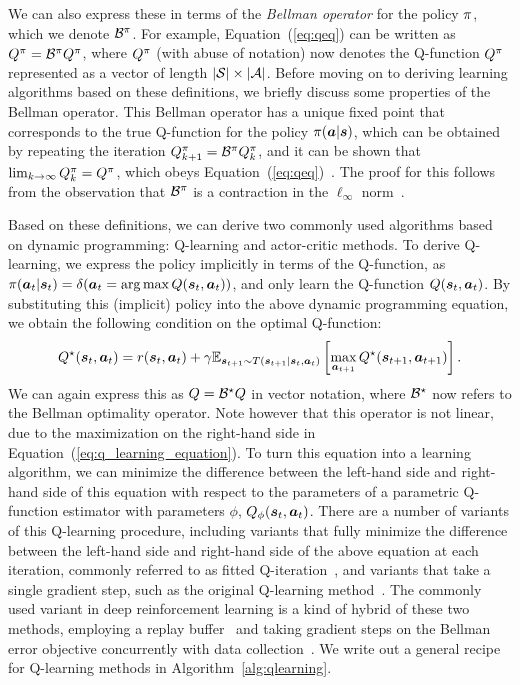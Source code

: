 \documentclass[../thesis.tex]{subfiles}
\begin{document}
We can also express these in terms of the \emph{Bellman operator} for the policy $\pi$, which we denote $\mathcal{B}^\pi$. For example, Equation~(\ref{eq:qeq}) can be written as ${Q}^\pi = \mathcal{B}^\pi {Q}^\pi$, where ${Q}^\pi$ (with abuse of notation) now denotes the Q-function $Q^\pi$ represented as a vector of length $|\mathcal{S}|\times |\mathcal{A}|$. Before moving on to deriving learning algorithms based on these definitions, we briefly discuss some properties of the Bellman operator. This Bellman operator has a unique fixed point that corresponds to the true Q-function for the policy $\pi(\boldsymbol{a}|\boldsymbol{s})$, which can be obtained by repeating the iteration ${Q}^\pi_{k+1} = \mathcal{B}^\pi {Q}^\pi_k$, and it can be shown that $\lim_{k \rightarrow \infty} {Q}^\pi_k = {Q}^\pi$, which obeys Equation~(\ref{eq:qeq})~\citep{suttonrlbook}. The proof for this follows from the observation that $\mathcal{B}^\pi$ is a contraction in the $\ell_\infty$ norm~\citep{lagoudakis2003least}.

Based on these definitions, we can derive two commonly used algorithms based on dynamic programming: Q-learning and actor-critic methods. To derive Q-learning, we express the policy implicitly in terms of the Q-function, as \mbox{$\pi(\boldsymbol{a}_t | \boldsymbol{s}_t) = \delta(\boldsymbol{a}_t = \arg\max Q(\boldsymbol{s}_t,\boldsymbol{a}_t))$}, and only learn the Q-function $Q(\boldsymbol{s}_t,\boldsymbol{a}_t)$. By substituting this (implicit) policy into the above dynamic programming equation, we obtain the following condition on the optimal Q-function:
\begin{equation}
Q^\star(\boldsymbol{s}_t, \boldsymbol{a}_t) = r(\boldsymbol{s}_t,\boldsymbol{a}_t) + \gamma \mathbb{E}_{\boldsymbol{s}_{t+1} \sim T(\boldsymbol{s}_{t+1}|\boldsymbol{s}_t,\boldsymbol{a}_t)}\left[
\max_{\boldsymbol{a}_{t+1}} Q^\star(\boldsymbol{s}_{t+1},\boldsymbol{a}_{t+1})
\right]. \label{eq:q_learning_equation}
\end{equation}
We can again express this as ${Q} = \mathcal{B}^\star {Q}$ in vector notation, where $\mathcal{B}^\star$ now refers to the Bellman optimality operator. Note however that this operator is not linear, due to the maximization on the right-hand side in Equation~(\ref{eq:q_learning_equation}). To turn this equation into a learning algorithm, we can minimize the difference between the left-hand side and right-hand side of this equation with respect to the parameters of a parametric Q-function estimator with parameters $\phi$, $Q_\phi(\boldsymbol{s}_t,\boldsymbol{a}_t)$. There are a number of variants of this Q-learning procedure, including variants that fully minimize the difference between the left-hand side and right-hand side of the above equation at each iteration, commonly referred to as fitted Q-iteration~\citep{ernst2005tree,riedmiller2005neural}, and variants that take a single gradient step, such as the original Q-learning method~\citep{watkins1992q}. The commonly used variant in deep reinforcement learning is a kind of hybrid of these two methods, employing a replay buffer~\citep{lin1992self} and taking gradient steps on the Bellman error objective concurrently with data collection~\citep{mnih2013playing}. We write out a general recipe for Q-learning methods in Algorithm~\ref{alg:qlearning}.
\end{document}
